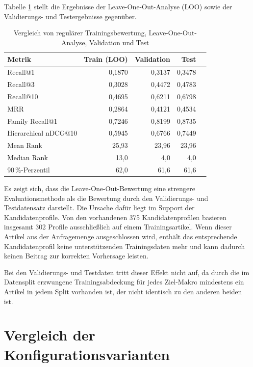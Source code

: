 Tabelle \ref{tab:loo_vergleich} stellt die Ergebnisse der Leave-One-Out-Analyse (LOO) sowie der Validierungs- und Testergebnisse gegenüber.

\begin{table}[H] 
  \centering 
  \caption{Vergleich von regulärer Trainingsbewertung, Leave-One-Out-Analyse, Validation und Test} 
  \label{tab:loo_vergleich} 
  \begin{tabular}{lrrrr} 
    \toprule 
    \textbf{Metrik} & \textbf{Train (LOO)} & \textbf{Validation} & \textbf{Test} \\ 
    \midrule 
    Recall@1 & 0,1870 & 0,3137 & 0,3478 \\
    Recall@3 & 0,3028 & 0,4472 & 0,4783 \\
    Recall@10 & 0,4695 & 0,6211 & 0,6798 \\
    MRR & 0,2864 & 0,4121 & 0,4534 \\
    Family Recall@1 & 0,7246 & 0,8199 & 0,8735 \\
    Hierarchical nDCG@10 & 0,5945 & 0,6766 & 0,7449 \\
    Mean Rank & 25,93 & 23,96 & 23,96 \\
    Median Rank & 13,0 & 4,0 & 4,0 \\
    90\,\%-Perzentil & 62,0 & 61,6 & 61,6 \\
        \bottomrule 
    \end{tabular} 
    \end{table}

Es zeigt sich, dass die Leave-One-Out-Bewertung eine strengere Evaluationsmethode als die Bewertung durch den Validierungs- und Testdatensatz darstellt.
Die Ursache dafür liegt im Support der Kandidatenprofile. Von den vorhandenen 375 Kandidatenprofilen basieren insgesamt 302 Profile ausschließlich auf einem Trainingsartikel.
Wenn dieser Artikel aus der Anfragemenge ausgeschlossen wird, enthält das entsprechende Kandidatenprofil keine unterstützenden Trainingsdaten mehr und kann dadurch keinen Beitrag zur korrekten Vorhersage leisten.

Bei den Validierungs- und Testdaten tritt dieser Effekt nicht auf, da durch die im Datensplit erzwungene Trainingsabdeckung für jedes Ziel-Makro \parencite{EPLAN-Makros} mindestens ein Artikel in jedem Split vorhanden ist, der nicht identisch zu den anderen beiden ist.


\section{Vergleich der Konfigurationsvarianten}

